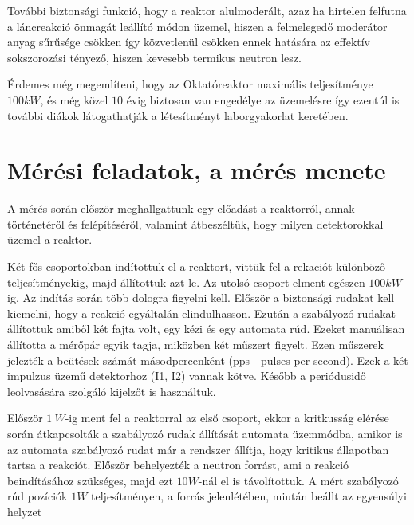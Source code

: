 \documentclass[a4paper,12pt]{article}
\begin{document}
\par További biztonsági funkció, hogy a reaktor alulmoderált, azaz ha hirtelen felfutna a láncreakció önmagát leállító módon üzemel, hiszen a felmelegedő moderátor anyag sűrűsége csökken így közvetlenül csökken ennek hatására az effektív sokszorozási tényező, hiszen kevesebb termikus neutron lesz.

\vspace{1cm}

\par Érdemes még megemlíteni, hogy az Oktatóreaktor maximális teljesítménye $100kW$, és még közel $10$ évig biztosan van engedélye az üzemelésre így ezentúl is további diákok látogathatják a létesítményt laborgyakorlat keretében.

\newpage

\section{Mérési feladatok, a mérés menete}

\par A mérés során először meghallgattunk egy előadást a reaktorról, annak történetéről és felépítéséről, valamint átbeszéltük, hogy milyen detektorokkal üzemel a reaktor. 

\vspace{.5cm}

\par Két fős csoportokban indítottuk el a reaktort, vittük fel a rekaciót különböző teljesítményekig, majd állítottuk azt le. Az utolsó csoport elment egészen $100kW$-ig. Az indítás során több dologra figyelni kell. Először a biztonsági rudakat kell kiemelni, hogy a reakció egyáltalán elindulhasson. Ezután a szabályozó rudakat állítottuk amiből két fajta volt, egy kézi és egy automata rúd. Ezeket manuálisan állította a mérőpár egyik tagja, miközben két műszert figyelt. Ezen műszerek jelezték a beütések számát másodpercenként (pps - pulses per second). Ezek a két impulzus üzemű detektorhoz (I1, I2) vannak kötve. Később a periódusidő leolvasására szolgáló kijelzőt is használtuk. 

\vspace{.5cm}

\par Először $1~W$-ig ment fel a reaktorral az első csoport, ekkor a kritkusság elérése során átkapcsolták a szabályozó rudak állítását automata üzemmódba, amikor is az automata szabályozó rudat már a rendszer állítja, hogy kritikus állapotban tartsa a reakciót. Először behelyezték a neutron forrást, ami a reakció beindításához szükséges, majd ezt $10 W$-nál el is távolítottuk. A mért szabályozó rúd pozíciók $1 W$ teljesítményen, a forrás jelenlétében, miután beállt az egyensúlyi helyzet
\end{document}
